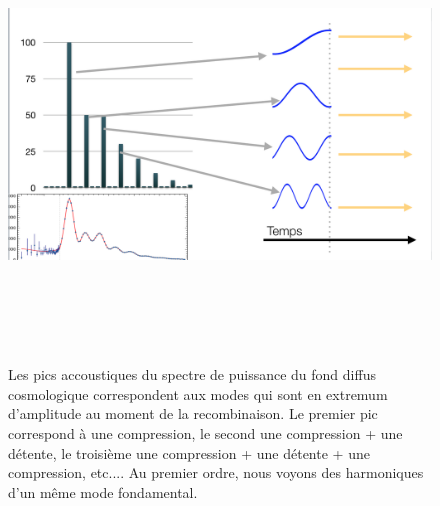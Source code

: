 \begin{figure}[htbp]
	\centering
		\includegraphics[height=12cm]{figs/bao2.png}
	\caption[Les pics accoustiques sont des extrema]{Les pics accoustiques du spectre de puissance du fond diffus cosmologique correspondent aux modes qui sont en extremum d'amplitude au moment de la recombinaison. Le premier pic correspond à une compression, le second une compression + une détente, le troisième une compression + une détente + une compression, etc.... Au premier ordre, nous voyons des harmoniques d'un même mode fondamental. }
	\label{f:bao2}
\end{figure}

